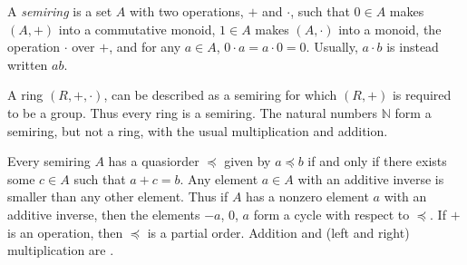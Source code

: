 \documentclass[12pt]{article}
\begin{document}


A \emph{semiring} is a set $A$ with two operations, $+$ and $\cdot$, such that
$0\in A$ makes $(A,+)$ into a commutative monoid, $1\in A$ makes $(A,\cdot)$
into a monoid, the operation $\cdot$ 
over $+$, and for any $a\in A$, $0\cdot a=a\cdot 0=0$.  Usually, $a\cdot b$
is instead written $ab$.

A ring $(R,+,\cdot)$, can be described as a semiring for which $(R,+)$ is
required to be a group.  Thus every ring is a semiring.  
The natural numbers
$\mathbb{N}$ form a semiring, but not a ring, with the usual multiplication and addition.

Every semiring $A$ has a quasiorder $\preceq$ 
given by $a\preceq b$ if and only if there exists some $c\in A$ such that $a+c=b$.  Any element $a\in A$ with an additive inverse is smaller than
any other element.  Thus if $A$ has a nonzero element $a$ with an additive 
inverse, then the elements $-a$, $0$, $a$ form a cycle with respect to $\preceq$.
If $+$ is an  operation,
then $\preceq$ is a partial order.
Addition and (left and right) multiplication are 
.
\end{document}
